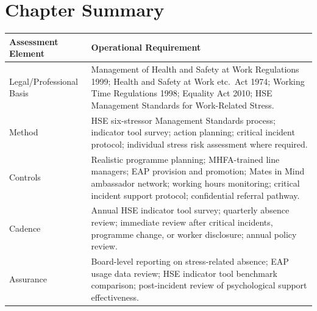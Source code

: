 
\newpage
\section{Chapter Summary}

\begin{table}[H]
\centering
\begin{tabularx}{\textwidth}{>{\raggedright\arraybackslash}p{3.2cm}X}
\toprule
\textbf{Assessment Element} & \textbf{Operational Requirement} \\
\midrule
Legal/Professional Basis & Management of Health and Safety at Work Regulations 1999; Health and Safety at Work etc.\ Act 1974; Working Time Regulations 1998; Equality Act 2010; HSE Management Standards for Work-Related Stress. \\
Method & HSE six-stressor Management Standards process; indicator tool survey; action planning; critical incident protocol; individual stress risk assessment where required. \\
Controls & Realistic programme planning; MHFA-trained line managers; EAP provision and promotion; Mates in Mind ambassador network; working hours monitoring; critical incident support protocol; confidential referral pathway. \\
Cadence & Annual HSE indicator tool survey; quarterly absence review; immediate review after critical incidents, programme change, or worker disclosure; annual policy review. \\
Assurance & Board-level reporting on stress-related absence; EAP usage data review; HSE indicator tool benchmark comparison; post-incident review of psychological support effectiveness. \\
\bottomrule
\end{tabularx}
\end{table}

